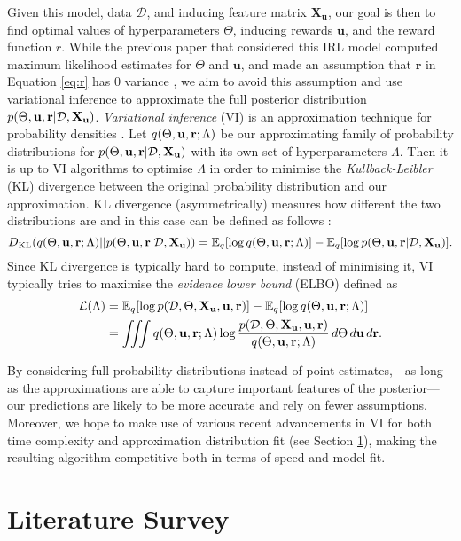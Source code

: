 \documentclass{mprop}
\theoremstyle{definition}
\begin{document}
Given this model, data $\mathcal{D}$, and inducing feature matrix
$\mathbf{X_u}$, our goal is then to find optimal values of hyperparameters
$\Theta$, inducing rewards $\mathbf{u}$, and the reward function $r$. While the
previous paper that considered this IRL model computed maximum likelihood estimates
for $\Theta$ and $\mathbf{u}$, and made an assumption that $\mathbf{r}$ in
Equation \ref{eq:r} has $0$ variance \cite{DBLP:conf/nips/LevinePK11}, we aim to
avoid this assumption and use variational inference to approximate the full
posterior distribution $p(\Theta, \mathbf{u}, \mathbf{r} | \mathcal{D}, \mathbf{X_u})$. \emph{Variational inference} (VI) is an
approximation technique for probability densities \cite{blei2017variational}.
Let $q(\Theta, \mathbf{u}, \mathbf{r}; \Lambda)$ be our approximating family of probability distributions
for $p(\Theta, \mathbf{u}, \mathbf{r} | \mathcal{D}, \mathbf{X_u})$ with its own set of hyperparameters $\Lambda$. Then it is up to
VI algorithms to optimise $\Lambda$ in order to minimise the
\emph{Kullback-Leibler} (KL) divergence between the original probability
distribution and our approximation.  KL divergence (asymmetrically) measures how
different the two distributions are and in this case can be defined as follows
\cite{blei2017variational}:
\[ D_{\mathrm{KL}}(q(\Theta, \mathbf{u}, \mathbf{r}; \Lambda) || p(\Theta, \mathbf{u}, \mathbf{r} | \mathcal{D}, \mathbf{X_u})) = \mathbb{E}_q[\log q(\Theta, \mathbf{u}, \mathbf{r}; \Lambda)] -
  \mathbb{E}_q[\log p(\Theta, \mathbf{u}, \mathbf{r} | \mathcal{D}, \mathbf{X_u})]. \]
Since KL divergence is typically hard to compute, instead of minimising it, VI
typically tries to maximise the \emph{evidence lower bound} (ELBO) defined as
\[
  \begin{split}
    \mathcal{L}(\Lambda) &= \mathbb{E}_q[\log p(\mathcal{D}, \Theta, \mathbf{X_u}, \mathbf{u}, \mathbf{r})] -
    \mathbb{E}_q[\log q(\Theta, \mathbf{u}, \mathbf{r}; \Lambda)] \\
    &= \iiint q(\Theta, \mathbf{u}, \mathbf{r}; \Lambda) \log
    \frac{p(\mathcal{D}, \Theta, \mathbf{X_u}, \mathbf{u}, \mathbf{r})}{q(\Theta, \mathbf{u}, \mathbf{r}; \Lambda)}\,d\Theta\,d\mathbf{u}\,d\mathbf{r}.
  \end{split}
\]

By considering full probability distributions instead of point estimates,---as
long as the approximations are able to capture important features of the
posterior---our predictions are likely to be more accurate and rely on fewer
assumptions. Moreover, we hope to make use of various recent advancements in VI
for both time complexity and approximation distribution fit (see Section
\ref{literature}), making the resulting algorithm competitive both in terms of
speed and model fit.

\section{Literature Survey} \label{literature}
\end{document}
